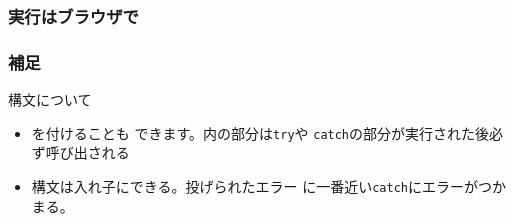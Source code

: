 \begin{frame}[containsverbatim]
 \frametitle{実行はブラウザで}
\end{frame}
\begin{frame}[containsverbatim]
 \frametitle{補足}
構文について
\begin{itemize}
 \item {}を付けることも
できます。内の部分は\texttt{try}や
\texttt{catch}の部分が実行された後必ず呼び出される
 \item {}構文は入れ子にできる。投げられたエラー
			 に一番近い\texttt{catch}にエラーがつかまる。
\end{itemize}
\end{frame}



